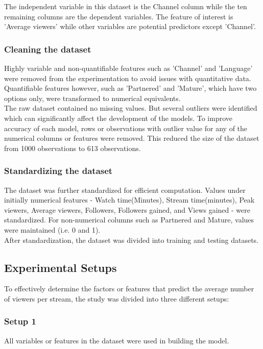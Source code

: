 \documentclass[runningheads]{llncs}
\begin{document}
The independent variable in this dataset is the Channel column while the ten remaining columns are the dependent variables. The feature of interest is 'Average viewers' while other variables are potential predictors except 'Channel'.

\subsubsection{Cleaning the dataset}
Highly variable and non-quantifiable features such as 'Channel' and 'Language' were removed from the experimentation to avoid issues with quantitative data. Quantifiable features however, such as 'Partnered' and 'Mature', which have two options only, were transformed to numerical equivalents. \\

The raw dataset contained no missing values. But several outliers were identified which can significantly affect the development of the models. To improve accuracy of each model, rows or observations with outlier value for any of the numerical columns or features were removed. This reduced the size of the dataset from 1000 observations to 613 observations. 


\subsubsection{Standardizing the dataset}
The dataset was further standardized for efficient computation. Values under initially numerical features - Watch time(Minutes), Stream time(minutes), Peak viewers, Average viewers, Followers, Followers gained, and Views gained - were standardized.  For non-numerical columns such as Partnered and Mature, values were maintained (i.e. 0 and 1). \\

After standardization, the dataset was divided into training and testing datasets.

\subsection{Experimental Setups}
To effectively determine the factors or features that predict the average number of viewers per stream, the study was divided into three different setups:

\subsubsection{Setup 1} All variables or features in the dataset were used in building the model.
\end{document}
